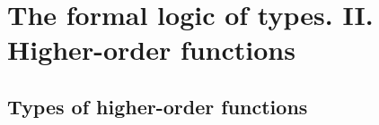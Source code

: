 
\chapter{The formal logic of types. II. Higher-order functions\label{chap:Higher-order-functions}}

\section{Types of higher-order functions}

\begin{comment}
we will talk about the types of higher-order functions higher-order
functions are functions that return functions or that take functions
as arguments it very interesting thing happens when you consider functions
that return a function here is an example the function log width it
takes a string argument which is not itself a function so that's just
a normal argument non function but it returns the type which is a
function so it returns the value of type function from string to unit
why would we want to use such a function well for example we want
a logger function we want something that prints logging statements
and we want to prepare this logger so that whatever statemented prints
before that statement it also writes the topic of the statement let's
say some topics such as result or intermediate or something like this
to prepare this function we give a topic and then we return an expression
which is itself a function the function takes some argument X and
prints a string which is topic : X so then in the code we will say
something like this a status logger is a function from string to unit
well it's just going from strength to unit because println returns
unit it does not return any you school value this is just an example
so status logger is a function from string to unit which we obtain
by calling log width on the string argument result status and the
result will be that status logger will be a function that prints let's
say success but before success it prints result status so this is
a mistake actually this should be status log you're not a primary
logger I will fix that in the slides so this must be primary not primary
logging about status vulgar for this code to work so the result is
that status logger called on success will print result status which
is the topic : success and we can call the same function in the syntax
that is in one line so you see here we first made this call which
returns this value and then we call that same value sorry about this
area we call that same value on a success and we can do the same since

\end{comment}
